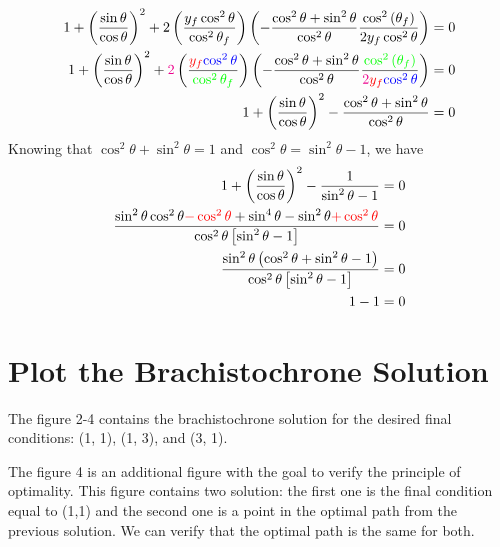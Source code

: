\documentclass{article}
\begin{document}
\begin{eqnarray*}
\begin{split}
1 + \left( \frac{\sin\theta}{\cos\theta} \right)^2 + 2 \left(\frac{y_f \cos^2\theta}{\cos^2\theta_f} \right)\left( -\frac{\cos^2\theta + \sin^2\theta}{\cos^2\theta}\frac{ \cos^2\left(\theta_f\right)}{2y_f \cos^2\theta}\right) &= 0 \\ 
1 + \left( \frac{\sin\theta}{\cos\theta} \right)^2 + \textcolor{magenta}{2} \left(\frac{\textcolor{red}{y_f} \textcolor{blue}{\cos^2\theta}}{\textcolor{green}{\cos^2\theta_f}} \right)\left( -\frac{\cos^2\theta + \sin^2\theta}{\cos^2\theta}\frac{ \textcolor{green}{\cos^2\left(\theta_f\right)}}{\textcolor{magenta}{2}\textcolor{red}{y_f} \textcolor{blue}{\cos^2\theta}}\right) &= 0 \\ 
1 + \left( \frac{\sin\theta}{\cos\theta} \right)^2 - \frac{\cos^2\theta + \sin^2\theta}{\cos^2\theta} &= 0 \\ 
\end{split}
\end{eqnarray*}
Knowing that $ \cos^2\theta + \sin^2\theta = 1 $ and $ \cos^2\theta = \sin^2\theta -1 $, we have
\begin{eqnarray*}
\begin{split}
1 + \left( \frac{\sin\theta}{\cos\theta} \right)^2 - \frac{1}{\sin^2\theta -1 } &= 0 \\ 
\frac{\sin^2\theta\cos^2\theta \textcolor{red}{-\cos^2\theta} + \sin^4\theta -\sin^2\theta \textcolor{red}{+ \cos^2\theta}}{\cos^2\theta\left[\sin^2\theta-1 \right]} &= 0 \\ 
\frac{\sin^2\theta \left( \cos^2\theta + \sin^2\theta - 1 \right)}{\cos^2\theta\left[\sin^2\theta-1 \right]} &= 0 \\
1 - 1 &= 0
\end{split}
\end{eqnarray*}

 
\section{Plot the Brachistochrone Solution }

The figure 2-4 contains the brachistochrone solution for the desired final conditions: (1, 1), (1, 3), and (3, 1).

The figure 4 is an additional figure with the goal to verify the principle of optimality. This figure contains two solution: the first one is the final condition equal to (1,1) and the second one is a point in the optimal path from the previous solution. We can verify that the optimal path is the same for both. 
\end{document}
